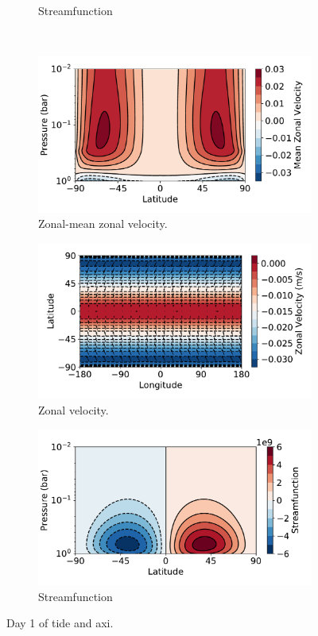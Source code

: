 \begin{figure}
\begin{subfigure}[t]{0.32\textwidth}
    \caption{Streamfunction}
  \end{subfigure}
  \\
  \begin{subfigure}[t]{0.32\textwidth}
    \includegraphics[width=\textwidth]{figures/eqm-zonal-flow/axi_1_u.pdf}
    \caption{Zonal-mean zonal velocity.}
  \end{subfigure}
  \begin{subfigure}[t]{0.32\textwidth}
    \includegraphics[width=\textwidth]{figures/eqm-zonal-flow/axi_1_surf_ucomp.pdf}
    \caption{Zonal velocity.}
  \end{subfigure}
  \begin{subfigure}[t]{0.32\textwidth}
    \includegraphics[width=\textwidth]{figures/eqm-zonal-flow/sf_axi_day1.pdf}
    \caption{Streamfunction}
  \end{subfigure}
  \caption{Day 1 of tide and axi.}
  \label{fig:day-1-tide-aci}
\end{figure}

